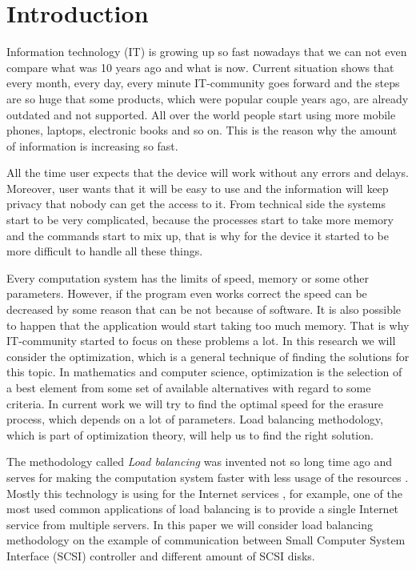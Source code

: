 \chapter{Introduction}
\label{chap1:title}

Information technology (IT) is growing up so fast nowadays that we can not even compare what was 10 years ago and what is now. Current situation shows that every month, every day, every minute IT-community goes forward and the steps are so huge that some products, which were popular couple years ago, are already outdated and not supported. All over the world people start using more mobile phones, laptops, electronic books and so on. This is the reason why the amount of information is increasing so fast. 

All the time user expects that the device will work without any errors and delays. Moreover, user wants that it will be easy to use and the information will keep privacy that nobody can get the access to it. From technical side the systems start to be very complicated, because the processes start to take more memory and the commands start to mix up, that is why for the device it started to be more difficult to handle all these things. 

Every computation system has the limits of speed, memory or some other parameters. However, if the program even works correct the speed can be decreased by some reason that can be not because of software. It is also possible to happen that the application would start taking too much memory. That is why IT-community started to focus on these problems a lot. In this research we will consider the optimization, which is a general technique of finding the solutions for this topic. In mathematics and computer science, optimization is the selection of a best element from some set of available alternatives with regard to some criteria. In current work we will try to find the optimal speed for the erasure process, which depends on a lot of parameters. Load balancing methodology, which is part of optimization theory, will help us to find the right solution.

The methodology called \emph{Load balancing} was invented not so long time ago and serves for making the computation system faster with less usage of the resources \cite{load_bal}. Mostly this technology is using for the Internet services \cite{dyn_bal_web}, for example, one of the most used common applications of load balancing is to provide a single Internet service from multiple servers. In this paper we will consider load balancing methodology on the example of communication between Small Computer System Interface (SCSI) controller and different amount of SCSI disks. 

